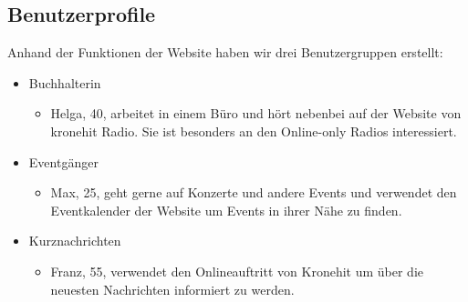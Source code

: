 \documentclass{article}
\begin{document}
	\subsection{Benutzerprofile}
	Anhand der Funktionen der Website haben wir drei Benutzergruppen erstellt:
	\begin{itemize}
		\item{Buchhalterin}
		\begin{itemize}
			\item{Helga, 40, arbeitet in einem Büro und hört nebenbei auf der Website von kronehit Radio. Sie ist besonders an den Online-only Radios interessiert.}
		\end{itemize}
		\item{Eventgänger}
		\begin{itemize}
			\item{Max, 25, geht gerne auf Konzerte und andere Events und verwendet den Eventkalender der Website um Events in ihrer Nähe zu finden.}
		\end{itemize}
		\item{Kurznachrichten}
		\begin{itemize}
			\item{Franz, 55, verwendet den Onlineauftritt von Kronehit um über die neuesten Nachrichten informiert zu werden.}
		\end{itemize}
	\end{itemize}
\end{document}
